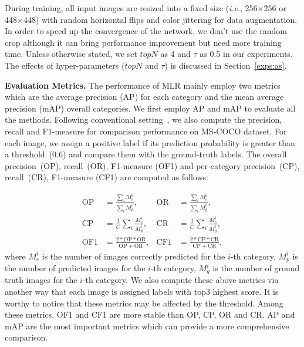\documentclass[journal]{IEEEtran}
\makeatletter
\DeclareRobustCommand\onedot{\@onedot}
\def\@onedot{.}
\def\ie{\emph{i.e}\onedot}
\makeatother
\begin{document}
During training, all input images are resized into a fixed size (\ie, 256$\times$256 or 448$\times$448) with random horizontal flips and color jittering for data augmentation. In order to speed up the convergence of the network, we don't use the random crop although it can bring performance improvement but need more training time. Unless otherwise stated, we set $topN$ as 4 and $\tau$ as 0.5 in our experiments. The effects of hyper-parameters ($topN$ and $\tau$) is discussed in Section~\ref{exps:as}. 


\noindent \textbf{Evaluation Metrics.} 
The performance of MLR mainly employ two metrics which are 
the average precision (AP) for each category and the mean average precision (mAP) overall categories. We first employ AP and mAP to evaluate all the methods.  Following conventional setting~\cite{wei2015hcp,chen2019multi,chenlearning},  we also compute the precision, recall and F1-measure for comparison performance on MS-COCO dataset. For each image, we assign a positive label if its prediction probability is greater than a threshold~(0.6) and compare them with the ground-truth labels. The overall precision~(OP), recall~(OR), F1-measure (OF1) and per-category precision~(CP), recall~(CR), F1-measure (CF1) are computed as follows:

 \begin{equation}
 \begin{aligned}
\mathrm{OP} &= \frac{\sum_i M_c^i}{\sum_i M_p^i}, &\mathrm{OR} &= \frac{\sum_i M_c^i}{\sum_i M_g^i}, \\
\mathrm{CP}&=\frac{1}{C}\sum_i \frac{M_c^i}{M_p^i}, &\mathrm{CR}&=\frac{1}{C}\sum_i \frac{M_c^i}{M_g^i}, \\
\mathrm{OF1}&=\frac{2*\mathrm{OP}*\mathrm{OR}}{\mathrm{OP}+\mathrm{OR}},
&\mathrm{CF1}&=\frac{2*\mathrm{CP}*\mathrm{CR}}{\mathrm{CP}+\mathrm{CR}},
 \end{aligned}
 \end{equation} 
where $M_c^i$ is the number of images correctly predicted for the $i$-th category,  $M_p^i$ is the number of predicted images for the $i$-th category, $M_g^i$ is the number of ground truth images for the $i$-th category. We also compute these above metrics via another way that each image is assigned labels with top3 highest score. It is worthy to notice that these metrics may be affected by the threshold.  Among these metrics, OF1 and CF1 are more stable than OP, CP, OR and CR. AP and mAP are the most important metrics which can provide a more comprehensive comparison.
\end{document}
